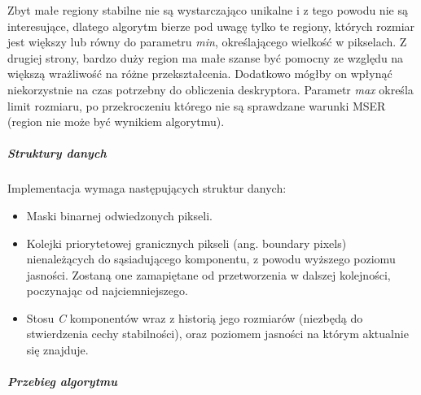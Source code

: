 Zbyt małe regiony stabilne nie są wystarczająco unikalne i z tego powodu nie są
interesujące, dlatego algorytm bierze pod uwagę tylko te regiony, których
rozmiar jest większy lub równy do parametru \textit{min}, określającego
wielkość w pikselach. Z drugiej strony, bardzo duży region ma małe szanse być
pomocny ze względu na większą wrażliwość na różne przekształcenia. Dodatkowo
mógłby on wpłynąć niekorzystnie na czas potrzebny do obliczenia deskryptora.
Parametr \textit{max} określa limit rozmiaru, po przekroczeniu którego nie są
sprawdzane warunki MSER (region nie może być wynikiem algorytmu).

\subparagraph{Struktury danych}

Implementacja wymaga następujących struktur danych: \begin{itemize} \item Maski
    binarnej odwiedzonych pikseli.  \item Kolejki priorytetowej granicznych
    pikseli (ang. boundary pixels) nienależących do sąsiadującego komponentu, z
    powodu wyższego poziomu jasności. Zostaną one zamapiętane od przetworzenia
    w dalszej kolejności, poczynając od najciemniejszego.  \item Stosu
    \textit{C} komponentów wraz z historią jego rozmiarów (niezbędą do
    stwierdzenia cechy stabilności), oraz poziomem jasności na którym aktualnie
    się znajduje.  \end{itemize}

\subparagraph{Przebieg algorytmu}

